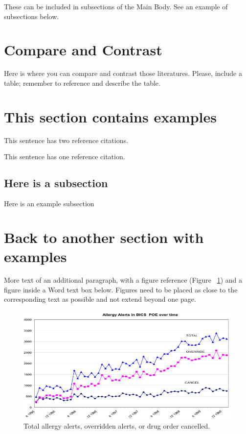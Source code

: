 \documentclass{amia}
\begin{document}
These can be included in subsections of the Main Body. See an example of subsections below.

\section{Compare and Contrast}

Here is where you can compare and contrast those literatures. Please, include a table; remember to reference and describe the table. 

\section{This section contains examples}

This sentence has two reference citations\cite{leaman2008banner, yarowsky1995unsupervised}.

This sentence has one reference citation\cite{bort2020discovery}.

\subsection{Here is a subsection}
    Here is an example subsection

\section{Back to another section with examples}

More text of an additional paragraph, with a figure reference (Figure ~\ref{fig1}) and a figure inside a Word text box below.  Figures need to be placed as close to the corresponding text as possible and not extend beyond one page.\\
\begin{figure}[h!]
\centering
\includegraphics[scale=1]{pics/figure1.png}
\caption{Total allergy alerts, overridden alerts, or drug order cancelled.}
\label{fig1}
\end{figure}
\end{document}
